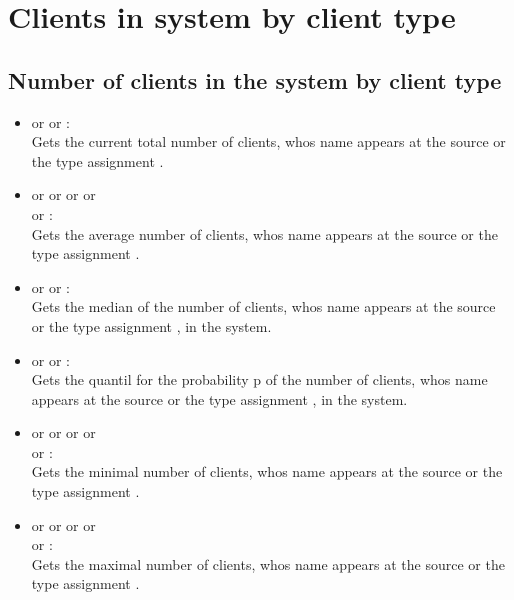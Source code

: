 \section{Clients in system by client type}



\subsection{Number of clients in the system by client type}

\begin{itemize}

\item
{} or  or :\\
Gets the current total number of clients, whos name appears at the source or the type assignment .

\item
{} or  or  or  or\\
 or :\\
Gets the average number of clients, whos name appears at the source or the type assignment .

\item
{} or  or :\\
Gets the median of the number of clients, whos name appears at the source or the type assignment , in the system.

\item
{} or  or :\\
Gets the quantil for the probability p of the number of clients, whos name appears at the source or the type assignment , in the system.

\item
{} or  or  or  or\\
 or :\\
Gets the minimal number of clients, whos name appears at the source or the type assignment .

\item
{} or  or  or  or\\
 or :\\
Gets the maximal number of clients, whos name appears at the source or the type assignment .


\end{itemize}
